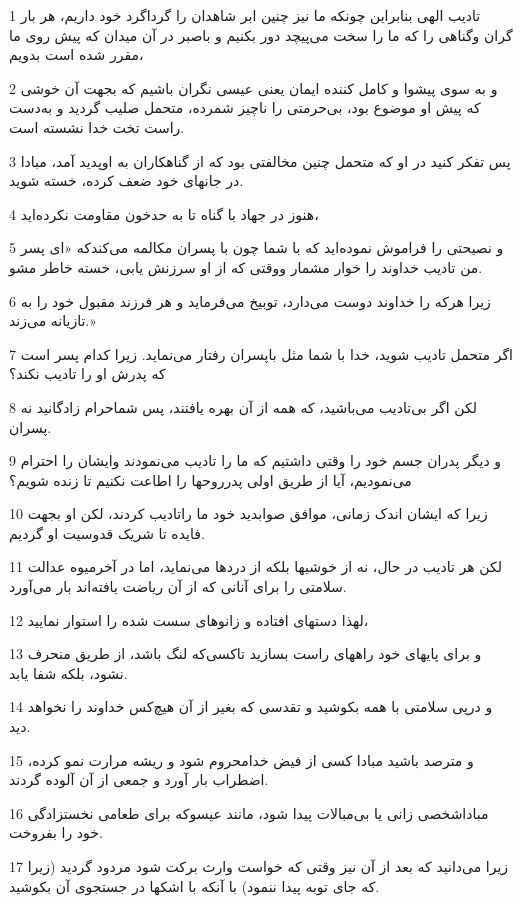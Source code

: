 \par 1 تادیب الهی بنابراین چونکه ما نیز چنین ابر شاهدان را گرداگرد خود داریم، هر بار گران وگناهی را که ما را سخت می‌پیچد دور بکنیم و باصبر در آن میدان که پیش روی ما مقرر شده است بدویم،
\par 2 و به سوی پیشوا و کامل کننده ایمان یعنی عیسی نگران باشیم که بجهت آن خوشی که پیش او موضوع بود، بی‌حرمتی را ناچیز شمرده، متحمل صلیب گردید و به‌دست راست تخت خدا نشسته است.
\par 3 پس تفکر کنید در او که متحمل چنین مخالفتی بود که از گناهکاران به اوپدید آمد، مبادا در جانهای خود ضعف کرده، خسته شوید.
\par 4 هنوز در جهاد با گناه تا به حدخون مقاومت نکرده‌اید،
\par 5 و نصیحتی را فراموش نموده‌اید که با شما چون با پسران مکالمه می‌کندکه «ای پسر من تادیب خداوند را خوار مشمار ووقتی که از او سرزنش یابی، خسته خاطر مشو.
\par 6 زیرا هر‌که را خداوند دوست می‌دارد، توبیخ می‌فرماید و هر فرزند مقبول خود را به تازیانه می‌زند.»
\par 7 اگر متحمل تادیب شوید، خدا با شما مثل باپسران رفتار می‌نماید. زیرا کدام پسر است که پدرش او را تادیب نکند؟
\par 8 لکن اگر بی‌تادیب می‌باشید، که همه از آن بهره یافتند، پس شماحرام زادگانید نه پسران.
\par 9 و دیگر پدران جسم خود را وقتی داشتیم که ما را تادیب می‌نمودند وایشان را احترام می‌نمودیم، آیا از طریق اولی پدرروحها را اطاعت نکنیم تا زنده شویم؟
\par 10 زیرا که ایشان اندک زمانی، موافق صوابدید خود ما راتادیب کردند، لکن او بجهت فایده تا شریک قدوسیت او گردیم.
\par 11 لکن هر تادیب در حال، نه از خوشیها بلکه از دردها می‌نماید، اما در آخرمیوه عدالت سلامتی را برای آنانی که از آن ریاضت یافته‌اند بار می‌آورد.
\par 12 لهذا دستهای افتاده و زانوهای سست شده را استوار نمایید،
\par 13 و برای پایهای خود راههای راست بسازید تاکسی‌که لنگ باشد، از طریق منحرف نشود، بلکه شفا یابد.
\par 14 و در‌پی سلامتی با همه بکوشید و تقدسی که بغیر از آن هیچ‌کس خداوند را نخواهد دید.
\par 15 و مترصد باشید مبادا کسی از فیض خدامحروم شود و ریشه مرارت نمو کرده، اضطراب بار آورد و جمعی از آن آلوده گردند.
\par 16 مباداشخصی زانی یا بی‌مبالات پیدا شود، مانند عیسوکه برای طعامی نخستزادگی خود را بفروخت.
\par 17 زیرا می‌دانید که بعد از آن نیز وقتی که خواست وارث برکت شود مردود گردید (زیرا که جای توبه پیدا ننمود) با آنکه با اشکها در جستجوی آن بکوشید.
